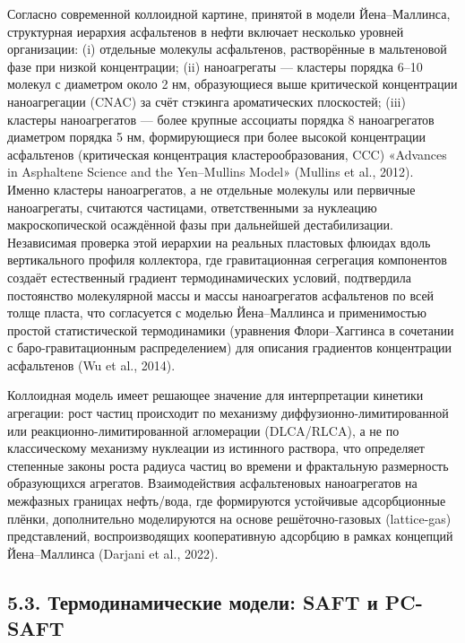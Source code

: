 \documentclass[11pt]{extarticle}
\begin{document}
Согласно современной коллоидной картине, принятой в модели Йена--Маллинса, структурная иерархия асфальтенов в нефти включает несколько уровней организации: (i) отдельные молекулы асфальтенов, растворённые в мальтеновой фазе при низкой концентрации; (ii) наноагрегаты --- кластеры порядка 6--10 молекул с диаметром около 2 нм, образующиеся выше критической концентрации наноагрегации (CNAC) за счёт стэкинга ароматических плоскостей; (iii) кластеры наноагрегатов --- более крупные ассоциаты порядка 8 наноагрегатов диаметром порядка 5 нм, формирующиеся при более высокой концентрации асфальтенов (критическая концентрация кластерообразования, CCC) «Advances in Asphaltene Science and the Yen--Mullins Model» (Mullins et al., 2012). Именно кластеры наноагрегатов, а не отдельные молекулы или первичные наноагрегаты, считаются частицами, ответственными за нуклеацию макроскопической осаждённой фазы при дальнейшей дестабилизации. Независимая проверка этой иерархии на реальных пластовых флюидах вдоль вертикального профиля коллектора, где гравитационная сегрегация компонентов создаёт естественный градиент термодинамических условий, подтвердила постоянство молекулярной массы и массы наноагрегатов асфальтенов по всей толще пласта, что согласуется с моделью Йена--Маллинса и применимостью простой статистической термодинамики (уравнения Флори--Хаггинса в сочетании с баро-гравитационным распределением) для описания градиентов концентрации асфальтенов (Wu et al., 2014).

Коллоидная модель имеет решающее значение для интерпретации кинетики агрегации: рост частиц происходит по механизму диффузионно-лимитированной или реакционно-лимитированной агломерации (DLCA/RLCA), а не по классическому механизму нуклеации из истинного раствора, что определяет степенные законы роста радиуса частиц во времени и фрактальную размерность образующихся агрегатов. Взаимодействия асфальтеновых наноагрегатов на межфазных границах нефть/вода, где формируются устойчивые адсорбционные плёнки, дополнительно моделируются на основе решёточно-газовых (lattice-gas) представлений, воспроизводящих кооперативную адсорбцию в рамках концепций Йена--Маллинса (Darjani et al., 2022).

\subsection{5.3. Термодинамические модели: SAFT и PC-SAFT}\label{ux442ux435ux440ux43cux43eux434ux438ux43dux430ux43cux438ux447ux435ux441ux43aux438ux435-ux43cux43eux434ux435ux43bux438-saft-ux438-pc-saft}
\end{document}
